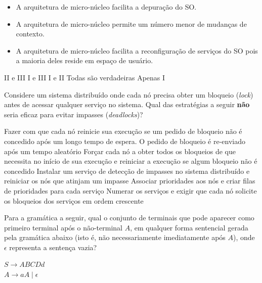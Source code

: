 \documentclass[12pt, addpoints]{exam}
\begin{document}
\begin{questions}
\begin{itemize}

    \item[I] A arquitetura de micro-núcleo facilita a depuração do SO.

    \item[II] A arquitetura de micro-núcleo permite um número menor de mudanças de contexto.

    \item[III] A arquitetura de micro-núcleo facilita a reconfiguração de serviços do SO pois a maioria deles reside em espaço de usuário.

\end{itemize}
\begin{choices}
\choice II e III
\choice I e III
\choice I e II
\choice Todas são verdadeiras
\choice Apenas I
\end{choices}

\question

Considere um sistema distribuído onde cada nó precisa obter um bloqueio (\textit{lock}) antes de acessar qualquer serviço no sistema. Qual das estratégias a seguir \textbf{não} seria eficaz para evitar impasses (\textit{deadlocks})?
\begin{choices}
\choice Fazer com que cada nó reinicie sua execução se um pedido de bloqueio não é concedido após um longo tempo de espera. O pedido de bloqueio é re-enviado após um tempo aleatório
\choice Forçar cada nó a obter todos os bloqueios de que necessita no início de sua execução e reiniciar a execução se algum bloqueio não é concedido
\choice Instalar um serviço de detecção de impasses no sistema distribuído e reiniciar os nós que atinjam um impasse
\choice Associar prioridades aos nós e criar filas de prioridades para cada serviço
\choice Numerar os serviços e exigir que cada nó solicite os bloqueios dos serviços em ordem crescente
\end{choices}

\question

Para a gramática a seguir, qual o conjunto de terminais que pode aparecer como primeiro terminal após o não-terminal \( A \), em qualquer forma sentencial gerada pela gramática abaixo (isto é, não necessariamente imediatamente após \( A \)), onde \( \epsilon \) representa a sentença vazia?



$S \rightarrow ABCDd$\\

$A \rightarrow aA \mid \epsilon$\\


\end{questions}
\end{document}
